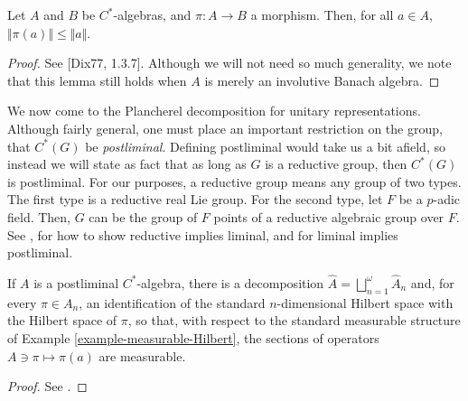 \begin{lemma}
\label{lemma-norm-bounded}
Let $A$ and $B$ be $C^*$-algebras, and $\pi:A\to B$ a morphism. Then, for all $a\in A$, $\Vert\pi(a)\Vert\leq \Vert a\Vert$.
 \end{lemma}

\begin{proof}
See [Dix77, 1.3.7]. Although we will not need so much generality, we note that this lemma still holds when $A$ is merely an involutive Banach algebra.
\end{proof}


We now come to the Plancherel decomposition for unitary representations. Although fairly general, one must place an important restriction on the group, that $C^*(G)$ be {\it postliminal}. Defining postliminal would take us a bit afield, so instead we will state as fact that as long as $G$ is a reductive group, then $C^*(G)$ is postliminal. For our purposes, a reductive group means any group of two types. The first type is a reductive real Lie group. For the second type, let $F$ be a $p$-adic field. Then, $G$ can be the group of $F$ points of a reductive algebraic group over $F$. See \cite[18.9.4]{Dixmier-Cstar}, \cite[4.7.11]{Dixmier-Cstar} for how to show reductive implies liminal, and \cite[4.2.4]{Dixmier-Cstar} for liminal implies postliminal.

\begin{proposition}
 \label{proposition-bundle-representations}
If $A$ is a postliminal $C^*$-algebra, there is a decomposition $\hat A = \bigsqcup_{n=1}^{\omega} \hat A_n$ and, for every $\pi\in A_n$, an identification of the standard $n$-dimensional Hilbert space with the Hilbert space of $\pi$, so that, with respect to the standard measurable structure of Example \ref{example-measurable-Hilbert}, the sections of operators $A\ni \pi\mapsto \pi(a)$ are measurable.
\end{proposition}

\begin{proof}
 See \cite[Lemma 8.6.2]{Dixmier-Cstar}.
\end{proof}




